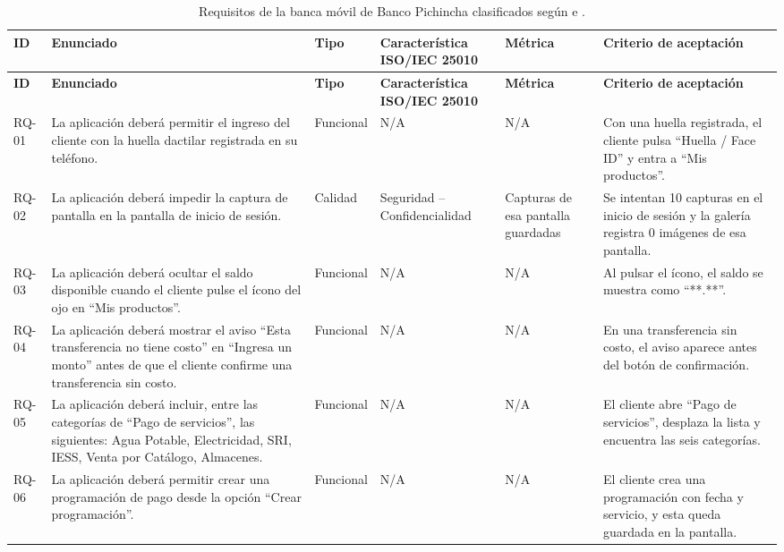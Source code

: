 \documentclass[11pt,a4paper]{article}
\begin{document}
{\footnotesize
\setlength{\tabcolsep}{3pt}
\begin{longtable}{|>{\raggedright\arraybackslash}p{0.95cm}|>{\raggedright\arraybackslash}p{4.7cm}|>{\raggedright\arraybackslash}p{1.6cm}|>{\raggedright\arraybackslash}p{2.4cm}|>{\raggedright\arraybackslash}p{2.1cm}|>{\raggedright\arraybackslash}p{3.7cm}|}
\caption{Requisitos de la banca móvil de Banco Pichincha clasificados según \cite{iso29148} e \cite{iso25010}.}\label{tab:requisitos}\\
\hline
\textbf{ID} & \textbf{Enunciado} & \textbf{Tipo} & \textbf{Característica ISO/IEC 25010} & \textbf{Métrica} & \textbf{Criterio de aceptación} \\ \hline
\endfirsthead
\hline
\textbf{ID} & \textbf{Enunciado} & \textbf{Tipo} & \textbf{Característica ISO/IEC 25010} & \textbf{Métrica} & \textbf{Criterio de aceptación} \\ \hline
\endhead
RQ-01 & La aplicación deberá permitir el ingreso del cliente con la huella dactilar registrada en su teléfono. & Funcional & N/A & N/A & Con una huella registrada, el cliente pulsa “Huella / Face ID” y entra a “Mis productos”. \\ \hline
RQ-02 & La aplicación deberá impedir la captura de pantalla en la pantalla de inicio de sesión. & Calidad & Seguridad – Confidencialidad & Capturas de esa pantalla guardadas & Se intentan 10 capturas en el inicio de sesión y la galería registra 0 imágenes de esa pantalla. \\ \hline
RQ-03 & La aplicación deberá ocultar el saldo disponible cuando el cliente pulse el ícono del ojo en “Mis productos”. & Funcional & N/A & N/A & Al pulsar el ícono, el saldo se muestra como “**.**”. \\ \hline
RQ-04 & La aplicación deberá mostrar el aviso “Esta transferencia no tiene costo” en “Ingresa un monto” antes de que el cliente confirme una transferencia sin costo. & Funcional & N/A & N/A & En una transferencia sin costo, el aviso aparece antes del botón de confirmación. \\ \hline
RQ-05 & La aplicación deberá incluir, entre las categorías de “Pago de servicios”, las siguientes: Agua Potable, Electricidad, SRI, IESS, Venta por Catálogo, Almacenes. & Funcional & N/A & N/A & El cliente abre “Pago de servicios”, desplaza la lista y encuentra las seis categorías. \\ \hline
RQ-06 & La aplicación deberá permitir crear una programación de pago desde la opción “Crear programación”. & Funcional & N/A & N/A & El cliente crea una programación con fecha y servicio, y esta queda guardada en la pantalla. \\ \hline

\end{longtable}}
\end{document}
